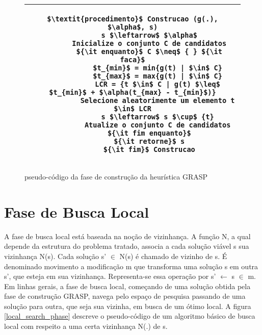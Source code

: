 \begin{figure}[H]
    \begin{center}
       \begin{tabular}{c} \hline
        \begin{lstlisting}[mathescape] 
		$\textit{procedimento}$ Construcao (g(.), $\alpha$, s)
		s $\leftarrow$ $\alpha$
		Inicialize o conjunto C de candidatos
		${\it enquanto}$ C $\neq$ { } ${\it faca}$
			$t_{min}$ = min{g(t) | $\in$ C}
			$t_{max}$ = max{g(t) | $\in$ C}
			LCR = {t $\in$ C | g(t) $\leq$ $t_{min}$ + $\alpha(t_{max} - t_{min}$)}
			Selecione aleatorimente um elemento t $\in$ LCR
			s $\leftarrow$ s $\cup$	{t}
			Atualize o conjunto C de candidatos
		${\it fim enquanto}$
		${\it retorne}$ s
		${\it fim}$ Construcao
	\end{lstlisting}\\
	\hline
 	\end{tabular}
     \end{center}
\caption{pseudo-código da fase de construção da heurística GRASP}
\label{construction_phase}
 \end{figure}


\section{Fase de Busca Local}
A fase de busca local está baseada na noção de vizinhança. A função N, a qual depende da estrutura do problema tratado, associa a cada solução viável s sua vizinhança N(s). Cada solução s' $\in$ N(s) é chamado de vizinho de s. É denominado movimento a modificação m que transforma uma solução s em outra s’, que esteja em sua vizinhança. Representa-se essa operação por s' $\leftarrow$ s $\in$ m. 
Em linhas gerais, a fase de busca local, começando de uma solução obtida pela fase de construção GRASP, navega pelo espaço de pesquisa passando de uma solução para outra, que seja sua vizinha, em busca de um ótimo local. 
A figura \ref{local_search_phase} descreve o pseudo-código de um algoritmo básico de busca local com respeito a uma certa vizinhança N(.) de s.


